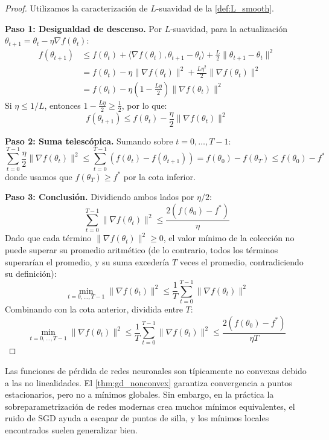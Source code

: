 \begin{proof}
	Utilizamos la caracterización de \(L\)-suavidad de la \autoref{def:L_smooth}.

	\textbf{Paso 1: Desigualdad de descenso.}
	Por \(L\)-suavidad, para la actualización \(\theta_{t+1} = \theta_t - \eta \nabla f(\theta_t)\):
	\begin{align*}
		f(\theta_{t+1}) &\leq f(\theta_t) + \langle \nabla f(\theta_t), \theta_{t+1} - \theta_t \rangle + \frac{L}{2}\|\theta_{t+1} - \theta_t\|^2 \\
		&= f(\theta_t) - \eta \|\nabla f(\theta_t)\|^2 + \frac{L\eta^2}{2}\|\nabla f(\theta_t)\|^2 \\
		&= f(\theta_t) - \eta\left(1 - \frac{L\eta}{2}\right)\|\nabla f(\theta_t)\|^2
	\end{align*}
	Si \(\eta \leq 1/L\), entonces \(1 - \frac{L\eta}{2} \geq \frac{1}{2}\), por lo que:
	\[
		f(\theta_{t+1}) \leq f(\theta_t) - \frac{\eta}{2}\|\nabla f(\theta_t)\|^2
	\]

	\textbf{Paso 2: Suma telescópica.}
	Sumando sobre \(t = 0, \ldots, T-1\):
	\[
		\sum_{t=0}^{T-1} \frac{\eta}{2}\|\nabla f(\theta_t)\|^2 \leq \sum_{t=0}^{T-1} \left(f(\theta_t) - f(\theta_{t+1})\right) = f(\theta_0) - f(\theta_T) \leq f(\theta_0) - f^*
	\]
	donde usamos que \(f(\theta_T) \geq f^*\) por la cota inferior.

	\textbf{Paso 3: Conclusión.}
	Dividiendo ambos lados por \(\eta/2\):
	\[
		\sum_{t=0}^{T-1} \|\nabla f(\theta_t)\|^2 \leq \frac{2(f(\theta_0) - f^*)}{\eta}
	\]
	Dado que cada término \(\|\nabla f(\theta_t)\|^2 \geq 0\), el valor mínimo de la colección no puede superar su promedio aritmético (de lo contrario, todos los términos superarían el promedio, y su suma excedería \(T\) veces el promedio, contradiciendo su definición):
	\[
		\min_{t=0,\ldots,T-1} \|\nabla f(\theta_t)\|^2 \leq \frac{1}{T}\sum_{t=0}^{T-1} \|\nabla f(\theta_t)\|^2
	\]
	Combinando con la cota anterior, dividida entre \(T\):
	\[
		\min_{t=0,\ldots,T-1} \|\nabla f(\theta_t)\|^2 \leq \frac{1}{T}\sum_{t=0}^{T-1} \|\nabla f(\theta_t)\|^2 \leq \frac{2(f(\theta_0) - f^*)}{\eta T}
	\]
\end{proof}

Las funciones de pérdida de redes neuronales son típicamente no convexas debido a las no linealidades. El \autoref{thm:gd_nonconvex} garantiza convergencia a puntos estacionarios, pero no a mínimos globales. Sin embargo, en la práctica la sobreparametrización de redes modernas crea muchos mínimos equivalentes, el ruido de \gls{SGD} ayuda a escapar de puntos de silla, y los mínimos locales encontrados suelen generalizar bien.

